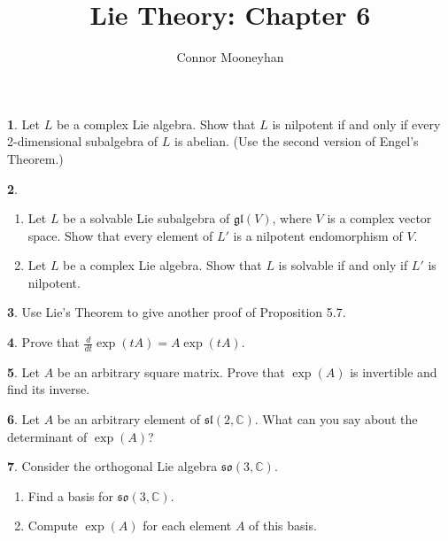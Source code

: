 \documentclass[12pt]{article}
\title{Lie Theory: Chapter 6}
\author{Connor Mooneyhan}
\date{}
\newcommand{\gl}{\mathfrak{gl}}
\newcommand{\so}{\mathfrak{so}}
\renewcommand{\sl}{\mathfrak{sl}}
\theoremstyle{definition}
\newtheorem{ex}{}
\begin{document}
\maketitle

\begin{ex}
	Let $L$ be a complex Lie algebra.
	Show that $L$ is nilpotent if and only if every 2-dimensional subalgebra of $L$ is abelian.
	(Use the second version of Engel's Theorem.)
\end{ex}

\begin{ex}\
	\begin{enumerate}[label=(\roman*)]
		\item Let $L$ be a solvable Lie subalgebra of $\gl(V)$, where $V$ is a complex vector space.
		      Show that every element of $L'$ is a nilpotent endomorphism of $V$.
		\item Let $L$ be a complex Lie algebra.
		      Show that $L$ is solvable if and only if $L'$ is nilpotent.
	\end{enumerate}
\end{ex}

\begin{ex}
	Use Lie's Theorem to give another proof of Proposition 5.7.
\end{ex}

\begin{ex}
	Prove that $\frac{d}{dt}\exp(tA) = A\exp(tA)$.
\end{ex}

\begin{ex}
	Let $A$ be an arbitrary square matrix.
	Prove that $\exp(A)$ is invertible and find its inverse.
\end{ex}

\begin{ex}
	Let $A$ be an arbitrary element of $\sl(2, \mathbb{C})$.
	What can you say about the determinant of $\exp(A)$?
\end{ex}

\begin{ex}
	Consider the orthogonal Lie algebra $\so(3, \mathbb{C})$.
	\begin{enumerate}[label=(\alph*)]
		\item Find a basis for $\so(3, \mathbb{C})$.
		\item Compute $\exp(A)$ for each element $A$ of this basis.
	\end{enumerate}
\end{ex}
\end{document}
